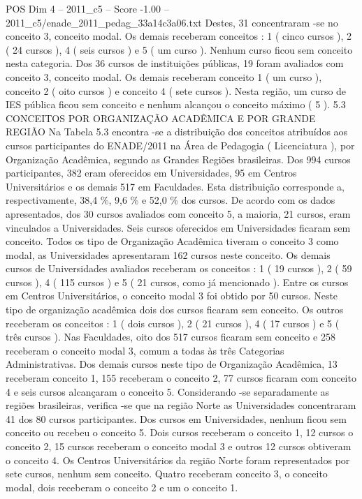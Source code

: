 \begin{textsample}{POS Dim 4 – 2011\_c5 – Score -1.00 – 2011\_c5/enade\_2011\_pedag\_33a14c3a06.txt}
Destes, 31 concentraram -se no conceito 3, conceito modal.
Os demais receberam conceitos : 1 ( cinco cursos ), 2 ( 24 cursos ), 4 ( seis cursos ) e 5 ( um curso ).
Nenhum curso ficou sem conceito nesta categoria.
Dos 36 cursos de instituições públicas, 19 foram avaliados com conceito 3, conceito modal.
Os demais receberam conceito 1 ( um curso ), conceito 2 ( oito cursos ) e conceito 4 ( sete cursos ).
Nesta região, um curso de IES pública ficou sem conceito e nenhum alcançou o conceito máximo ( 5 ). 5.3 CONCEITOS POR ORGANIZAÇÃO ACADÊMICA E POR GRANDE REGIÃO Na Tabela 5.3 encontra -se a distribuição dos conceitos atribuídos aos cursos participantes do ENADE/2011 na Área de Pedagogia ( Licenciatura ), por Organização Acadêmica, segundo as Grandes Regiões brasileiras.
Dos 994 cursos participantes, 382 eram oferecidos em Universidades, 95 em Centros Universitários e os demais 517 em Faculdades.
Esta distribuição corresponde a, respectivamente, 38,4 \%, 9,6 \% e 52,0 \% dos cursos.
De acordo com os dados apresentados, dos 30 cursos avaliados com conceito 5, a maioria, 21 cursos, eram vinculados a Universidades.
Seis cursos oferecidos em Universidades ficaram sem conceito.
Todos os tipo de Organização Acadêmica tiveram o conceito 3 como modal, as Universidades apresentaram 162 cursos neste conceito.
Os demais cursos de Universidades avaliados receberam os conceitos : 1 ( 19 cursos ), 2 ( 59 cursos ), 4 ( 115 cursos ) e 5 ( 21 cursos, como já mencionado ).
Entre os cursos em Centros Universitários, o conceito modal 3 foi obtido por 50 cursos.
Neste tipo de organização acadêmica dois dos cursos ficaram sem conceito.
Os outros receberam os conceitos : 1 ( dois cursos ), 2 ( 21 cursos ), 4 ( 17 cursos ) e 5 ( três cursos ).
Nas Faculdades, oito dos 517 cursos ficaram sem conceito e 258 receberam o conceito modal 3, comum a todas às três Categorias Administrativas.
Dos demais cursos neste tipo de Organização Acadêmica, 13 receberam conceito 1, 155 receberam o conceito 2, 77 cursos ficaram com conceito 4 e seis cursos alcançaram o conceito 5.
Considerando -se separadamente as regiões brasileiras, verifica -se que na região Norte as Universidades concentraram 41 dos 80 cursos participantes.
Dos cursos em Universidades, nenhum ficou sem conceito ou recebeu o conceito 5.
Dois cursos receberam o conceito 1, 12 cursos o conceito 2, 15 cursos receberam o conceito modal 3 e outros 12 cursos obtiveram o conceito 4.
Os Centros Universitários da região Norte foram representados por sete cursos, nenhum sem conceito.
Quatro receberam conceito 3, o conceito modal, dois receberam o conceito 2 e um o conceito 1.

\end{textsample}
